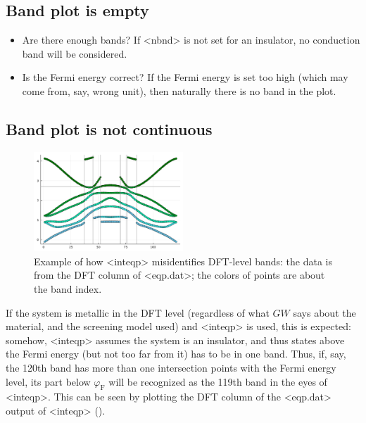 \documentclass[hyperref, a4paper, 12pt]{report}
\def\texttt#1{<#1>}%
\newcommand{\shortcode}[1]{\texttt{#1}}
\begin{document}
\subsection{Band plot is empty}

\begin{itemize}
    \item Are there enough bands? 
    If \shortcode{nbnd} is not set for an insulator,
    no conduction band will be considered.
    \item Is the Fermi energy correct? If the Fermi energy is set too high 
    (which may come from, say, wrong unit), 
    then naturally there is no band in the plot.
\end{itemize}

\subsection{Band plot is not continuous}\label{sec:discontinuous-band}

\begin{figure}
    \centering
    \includegraphics[width=0.5\textwidth]{plots/dft-level-bands.pdf}
    \caption{Example of how \shortcode{inteqp} misidentifies DFT-level bands:
    the data is from the DFT column of \shortcode{eqp.dat};
    the colors of points are about the band index.}
    \label{fig:inteqp-shuffle-band-index-1}
\end{figure}

If the system is metallic in the DFT level 
(regardless of what $GW$ says about the material, 
and the screening model used)
and \shortcode{inteqp} is used, 
this is expected:
somehow, \shortcode{inteqp} assumes the system is an insulator,
and thus states above the Fermi energy (but not too far from it)
has to be in one band.
Thus, if, say, the 120th band has more than one intersection points 
with the Fermi energy level,
its part below $\varphi_{\text{F}}$ will be recognized as the 119th band
in the eyes of \shortcode{inteqp}.
This can be seen by plotting the DFT column of the \shortcode{eqp.dat} output of \shortcode{inteqp}
().
\end{document}
